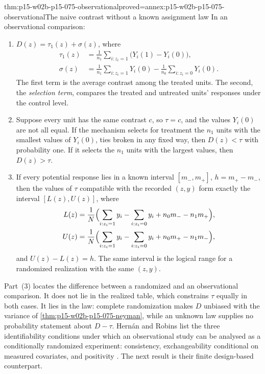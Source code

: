 \begin{hbtheorem}{thm:p15-w02b-p15-075-observational}{proved=annex:p15-w02b-p15-075-observational}{The naive contrast without a known assignment law}
In an observational comparison:
\begin{enumerate}
\item \(D(z)=\tau_1(z)+\sigma(z)\), where
\[
\begin{aligned}
 \tau_1(z)&=\frac1{n_1}\sum_{i:z_i=1}\bigl(Y_i(1)-Y_i(0)\bigr),\\
 \sigma(z)&=\frac1{n_1}\sum_{i:z_i=1}Y_i(0)-\frac1{n_0}\sum_{i:z_i=0}Y_i(0).
\end{aligned}
\]
The first term is the average contrast among the treated units. The second,
the \emph{selection term}, compares the treated and untreated units' responses
under the control level.
\item Suppose every unit has the same contrast \(c\), so \(\tau=c\), and the
values \(Y_i(0)\) are not all equal. If the mechanism selects for treatment the
\(n_1\) units with the smallest values of \(Y_i(0)\), ties broken in any fixed
way, then \(D(z)<\tau\) with probability one. If it selects the \(n_1\) units
with the largest values, then \(D(z)>\tau\).
\item If every potential response lies in a known interval \([m_-,m_+]\),
\(h=m_+-m_-\), then the values of \(\tau\) compatible with the recorded
\((z,y)\) form exactly the interval \([L(z),U(z)]\), where
\[
\begin{aligned}
 L(z)&=\frac1N\Bigl(\sum_{i:z_i=1}y_i-\sum_{i:z_i=0}y_i+n_0m_--n_1m_+\Bigr),\\
 U(z)&=\frac1N\Bigl(\sum_{i:z_i=1}y_i-\sum_{i:z_i=0}y_i+n_0m_+-n_1m_-\Bigr),
\end{aligned}
\]
and \(U(z)-L(z)=h\). The same interval is the logical range for a randomized
realization with the same \((z,y)\).
\end{enumerate}
\end{hbtheorem}

Part~(3) locates the difference between a randomized and an observational
comparison. It does not lie in the realized table, which constrains \(\tau\)
equally in both cases. It lies in the law: complete randomization makes
\(D\) unbiased with the variance of \cref{thm:p15-w02b-p15-075-neyman}, while an
unknown law supplies no probability statement about \(D-\tau\). Hern\'an and
Robins list the three identifiability conditions under which an observational
study can be analysed as a conditionally randomized experiment: consistency,
exchangeability conditional on measured covariates, and positivity
\cite[\S3.1, p.~28]{HernanRobins2020WhatIf2026}. The next result is their finite
design-based counterpart.

